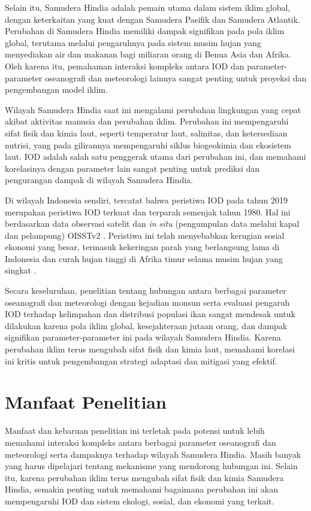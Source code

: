 \begin{spacing}{1.5}
	Selain itu, Samudera Hindia adalah pemain utama dalam sistem iklim global, dengan keterkaitan yang kuat dengan Samudera Pasifik dan Samudera Atlantik. Perubahan di Samudera Hindia memiliki dampak signifikan pada pola iklim global, terutama melalui pengaruhnya pada sistem musim hujan yang menyediakan air dan makanan bagi miliaran orang di Benua Asia dan Afrika. Oleh karena itu, pemahaman interaksi kompleks antara IOD dan parameter-parameter oseanografi dan meteorologi lainnya sangat penting untuk proyeksi dan pengembangan model iklim.
	
	Wilayah Samudera Hindia saat ini mengalami perubahan lingkungan yang cepat akibat aktivitas manusia dan perubahan iklim. Perubahan ini mempengaruhi sifat fisik dan kimia laut, seperti temperatur laut, salinitas, dan ketersediaan nutrisi, yang pada gilirannya mempengaruhi siklus biogeokimia dan ekosistem laut. IOD adalah salah satu penggerak utama dari perubahan ini, dan memahami korelasinya dengan parameter lain sangat penting untuk prediksi dan pengurangan dampak di wilayah Samudera Hindia.

	Di wilayah Indonesia sendiri, tercatat bahwa peristiwa IOD pada tahun 2019 merupakan peristiwa IOD terkuat dan terparah semenjak tahun 1980. Hal ini berdasarkan data observasi satelit dan \textit{in situ} (pengumpulan data melalui kapal dan pelampung) OISSTv2 \cite{Reynolds2002}. Peristiwa ini telah menyebabkan kerugian sosial ekonomi yang besar, termasuk kekeringan parah yang berlangsung lama di Indonesia dan curah hujan tinggi di Afrika timur selama musim hujan yang singkat \cite{Bo2020}.
	
	Secara keseluruhan, penelitian tentang hubungan antara berbagai parameter oseanografi dan meteorologi dengan kejadian monsun serta evaluasi pengaruh IOD terhadap kelimpahan dan distribusi populasi ikan sangat mendesak untuk dilakukan karena pola iklim global, kesejahteraan jutaan orang, dan dampak signifikan parameter-parameter ini pada wilayah Samudera Hindia. Karena perubahan iklim terus mengubah sifat fisik dan kimia laut, memahami korelasi ini kritis untuk pengembangan strategi adaptasi dan mitigasi yang efektif.
	\section[Manfaat Penelitian]{Manfaat Penelitian}
	
	Manfaat dan kebaruan penelitian ini terletak pada potensi untuk lebih memahami interaksi kompleks antara berbagai parameter oseanografi dan meteorologi serta dampaknya terhadap wilayah Samudera Hindia. Masih banyak yang harus dipelajari tentang mekanisme yang mendorong hubungan ini.
	Selain itu, karena perubahan iklim terus mengubah sifat fisik dan kimia Samudera Hindia, semakin penting untuk memahami bagaimana perubahan ini akan mempengaruhi IOD dan sistem ekologi, sosial, dan ekonomi yang terkait. 
	

\end{spacing}
